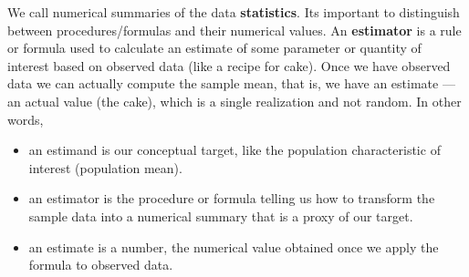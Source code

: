 \documentclass[
  11pt,
  letterpaper,
]{scrbook}
\providecommand{\tightlist}{%
  \setlength{\itemsep}{0pt}\setlength{\parskip}{0pt}}\usepackage{longtable,booktabs,array}
\theoremstyle{definition}
\theoremstyle{remark}
\begin{document}
We call numerical summaries of the data \textbf{statistics}. Its
important to distinguish between procedures/formulas and their numerical
values. An \textbf{estimator} is a rule or formula used to calculate an
estimate of some parameter or quantity of interest based on observed
data (like a recipe for cake). Once we have observed data we can
actually compute the sample mean, that is, we have an estimate --- an
actual value (the cake), which is a single realization and not random.
In other words,

\begin{itemize}
\tightlist
\item
  an estimand is our conceptual target, like the population
  characteristic of interest (population mean).
\item
  an estimator is the procedure or formula telling us how to transform
  the sample data into a numerical summary that is a proxy of our
  target.
\item
  an estimate is a number, the numerical value obtained once we apply
  the formula to observed data.
\end{itemize}
\end{document}
